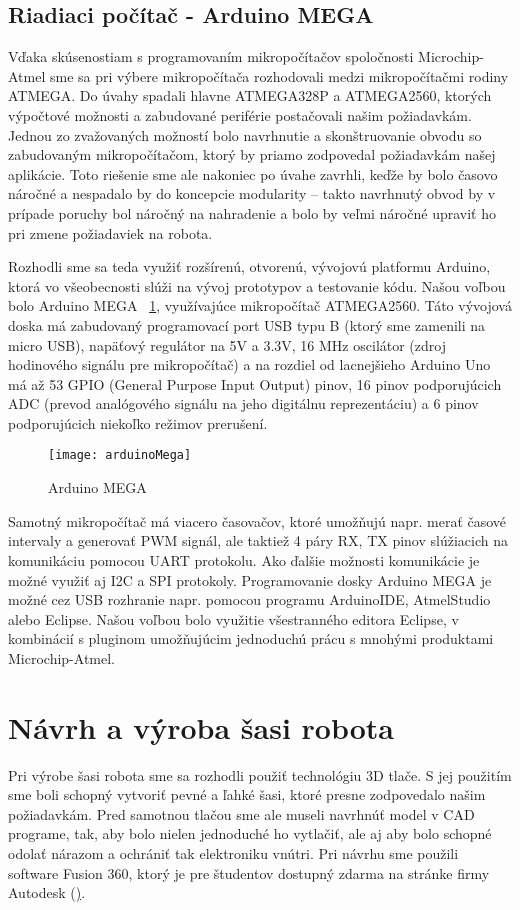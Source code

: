 \subsection{Riadiaci počítač - Arduino MEGA}
Vďaka skúsenostiam s programovaním mikropočítačov spoločnosti Microchip-Atmel sme sa pri výbere mikropočítača rozhodovali medzi mikropočítačmi rodiny ATMEGA. Do úvahy spadali hlavne ATMEGA328P a ATMEGA2560, ktorých výpočtové možnosti a zabudované periférie postačovali našim požiadavkám. Jednou zo zvažovaných možností bolo navrhnutie a skonštruovanie obvodu so zabudovaným mikropočítačom, ktorý by priamo zodpovedal požiadavkám našej aplikácie. Toto riešenie sme ale nakoniec po úvahe zavrhli, keďže by bolo časovo náročné a nespadalo by do koncepcie modularity – takto navrhnutý obvod by v prípade poruchy bol náročný na nahradenie a bolo by veľmi náročné upraviť ho pri zmene požiadaviek na robota.

Rozhodli sme sa teda využiť rozšírenú, otvorenú, vývojovú platformu Arduino, ktorá vo všeobecnosti slúži na vývoj prototypov a testovanie kódu. Našou voľbou bolo Arduino MEGA \figurename~\ref{fig:arduinoMega}, využívajúce mikropočítač ATMEGA2560. Táto vývojová doska má zabudovaný programovací port USB typu B (ktorý sme zamenili na micro USB), napäťový regulátor na 5V a 3.3V, 16 MHz oscilátor (zdroj hodinového signálu pre mikropočítač) a na rozdiel od lacnejšieho Arduino Uno má až 53 GPIO (General Purpose Input Output) pinov, 16 pinov podporujúcich ADC (prevod analógového signálu na jeho digitálnu reprezentáciu) a 6 pinov podporujúcich niekoľko režimov prerušení.

\begin{figure}[h]
\centering
\texttt{[image: arduinoMega]}
\caption{Arduino MEGA}
\label{fig:arduinoMega}
\end{figure}

Samotný mikropočítač má viacero časovačov, ktoré umožňujú napr. merať časové intervaly a generovať PWM signál, ale taktiež 4 páry RX, TX pinov slúžiacich na komunikáciu pomocou UART protokolu. Ako ďalšie možnosti komunikácie je možné využiť aj I2C a SPI protokoly. Programovanie dosky Arduino MEGA je možné cez USB rozhranie napr. pomocou programu ArduinoIDE, AtmelStudio alebo Eclipse. Našou voľbou bolo využitie všestranného editora Eclipse, v kombinácií s pluginom umožňujúcim jednoduchú prácu s mnohými produktami Microchip-Atmel.



\section{Návrh a výroba šasi robota}
Pri výrobe šasi robota sme sa rozhodli použiť technológiu 3D tlače. S jej použitím sme boli schopný vytvoriť pevné a ľahké šasi, ktoré presne zodpovedalo našim požiadavkám. Pred samotnou tlačou sme ale museli navrhnúť model v CAD programe, tak, aby bolo nielen jednoduché ho vytlačiť, ale aj aby bolo schopné odolať nárazom a ochrániť tak elektroniku vnútri. Pri návrhu sme použili software Fusion 360, ktorý je pre študentov dostupný zdarma na stránke firmy Autodesk (\href{https://www.autodesk.com/products/fusion-360/overview}).

